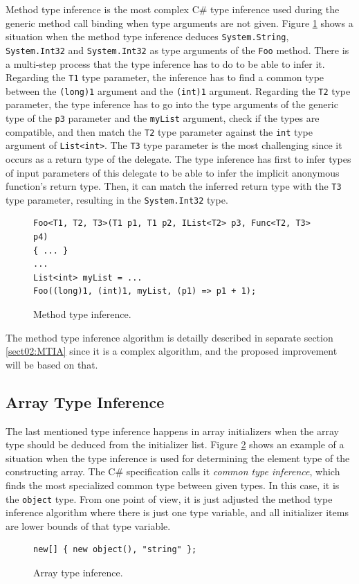 Method type inference is the most complex C\# type inference used during the generic method call binding when type arguments are not given.
Figure \ref{img09:methodTypeInf} shows a situation when the method type inference deduces \texttt{System.String},\\ \texttt{System.Int32} and \texttt{System.Int32} as type arguments of the \texttt{Foo} method. 
There is a multi-step process that the type inference has to do to be able to infer it. 
Regarding the \texttt{T1} type parameter, the inference has to find a common type between the \texttt{(long)1} argument and the \texttt{(int)1} argument. 
Regarding the \texttt{T2} type parameter, the type inference has to go into the type arguments of the generic type of the \texttt{p3} parameter and the \texttt{myList} argument, check if the types are compatible, and then match the \texttt{T2} type parameter against the \texttt{int} type argument of \texttt{List<int>}. 
The \texttt{T3} type parameter is the most challenging since it occurs as a return type of the delegate. 
The type inference has first to infer types of input parameters of this delegate to be able to infer the implicit anonymous function’s return type. 
Then, it can match the inferred return type with the \texttt{T3} type parameter, resulting in the \texttt{System.Int32} type.
\begin{figure}[h]
\begin{lstlisting}[style=csharp]
Foo<T1, T2, T3>(T1 p1, T1 p2, IList<T2> p3, Func<T2, T3> p4)
{ ... }
...
List<int> myList = ...
Foo((long)1, (int)1, myList, (p1) => p1 + 1);
\end{lstlisting}
\caption{Method type inference.}
\label{img09:methodTypeInf}
\end{figure}
\par
The method type inference algorithm is detailly described in separate section \ref{sect02:MTIA} since it is a complex algorithm, and the proposed improvement will be based on that.

\subsection{Array Type Inference}

The last mentioned type inference happens in array initializers when the array type should be deduced from the initializer list. 
Figure \ref{img14:arrayTypeInf} shows an example of a situation when the type inference is used for determining the element type of the constructing array. 
The C\# specification calls it \textit{common type inference}, which finds the most specialized common type between given types.
In this case, it is the \texttt{object} type.
From one point of view, it is just adjusted the method type inference algorithm where there is just one type variable, and all initializer items are lower bounds of that type variable.
\begin{figure}[h]
\begin{lstlisting}[style=csharp]
new[] { new object(), "string" };
\end{lstlisting}
\caption{Array type inference.}
\label{img14:arrayTypeInf}
\end{figure}

